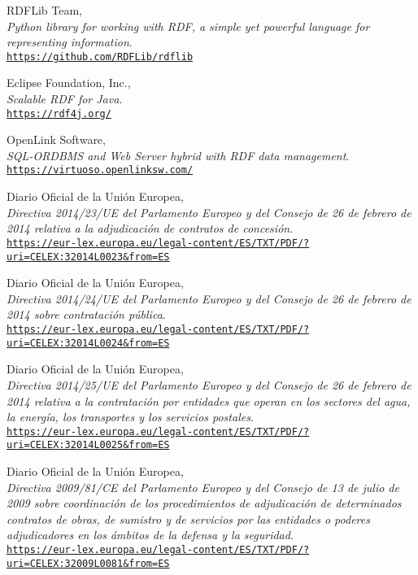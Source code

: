 \begin{thebibliography}{X}
            RDFLib Team,
            \\ \textit{Python library for working with RDF, a simple yet powerful language for representing information}.
            \\ \texttt{\url{https://github.com/RDFLib/rdflib}}
            
            Eclipse Foundation, Inc.,
            \\ \textit{Scalable RDF for Java}.
            \\ \texttt{\url{https://rdf4j.org/}}
            
            OpenLink Software,
            \\ \textit{SQL-ORDBMS and Web Server hybrid with RDF data management}.
            \\ \texttt{\url{https://virtuoso.openlinksw.com/}}
            
            Diario Oficial de la Unión Europea,
            \\ \textit{Directiva 2014/23/UE del Parlamento Europeo y del Consejo de 26 de febrero de 2014 relativa a la adjudicación de contratos de concesión}.
            \\ \texttt{\url{https://eur-lex.europa.eu/legal-content/ES/TXT/PDF/?uri=CELEX:32014L0023&from=ES}}
            
            Diario Oficial de la Unión Europea,
            \\ \textit{Directiva 2014/24/UE del Parlamento Europeo y del Consejo de 26 de febrero de 2014 sobre contratación pública}.
            \\ \texttt{\url{https://eur-lex.europa.eu/legal-content/ES/TXT/PDF/?uri=CELEX:32014L0024&from=ES}}
            
            Diario Oficial de la Unión Europea,
            \\ \textit{Directiva 2014/25/UE del Parlamento Europeo y del Consejo de 26 de febrero de 2014 relativa a la contratación por entidades que operan en los sectores del agua, la energía, los transportes y los servicios postales}.
            \\ \texttt{\url{https://eur-lex.europa.eu/legal-content/ES/TXT/PDF/?uri=CELEX:32014L0025&from=ES}}
            
            Diario Oficial de la Unión Europea,
            \\ \textit{Directiva 2009/81/CE del Parlamento Europeo y del Consejo de 13 de julio de 2009 sobre coordinación de los procedimientos de adjudicación de determinados contratos de obras, de sumistro y de servicios por las entidades o poderes adjudicadores en los ámbitos de la defensa y la seguridad}.
            \\ \texttt{\url{https://eur-lex.europa.eu/legal-content/ES/TXT/PDF/?uri=CELEX:32009L0081&from=ES}}
            

\end{thebibliography}
